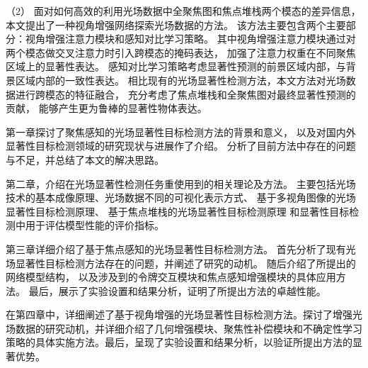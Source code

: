 %
%
（2）
%
%
面对如何高效的利用光场数据中全聚焦图和焦点堆栈两个模态的差异信息，
本文提出了一种视角增强网络探索光场数据的方法。
%
%
该方法主要包含两个主要部分：视角增强注意力模块和感知对比学习策略。
%
%
其中视角增强注意力模块通过对两个模态做交叉注意力时引入跨模态的掩码表达，
加强了注意力权重在不同聚焦区域上的显著性表达。
%
%
感知对比学习策略考虑显著性预测的前景区域内部，与背景区域内部的一致性表达。
%
%
相比现有的光场显著性检测方法，本文方法对光场数据进行跨模态的特征融合，
充分考虑了焦点堆栈和全聚焦图对最终显著性预测的贡献，
能够产生更为鲁棒的显著性物体表达。





第一章探讨了聚焦感知的光场显著性目标检测方法的背景和意义，
以及对国内外显著性目标检测领域的研究现状与进展作了介绍。
分析了目前方法中存在的问题与不足，并总结了本文的解决思路。


第二章，介绍在光场显著性检测任务重使用到的相关理论及方法。
主要包括光场技术的基本成像原理、光场数据不同的可视化表示方式、
基于多视角图像的光场显著性目标检测原理、
基于焦点堆栈的光场显著性目标检测原理
和显著性目标检测中用于评估模型性能的评价指标。


第三章详细介绍了基于焦点感知的光场显著性目标检测方法。
首先分析了现有光场显著性目标检测方法存在的问题，并阐述了研究的动机。
随后介绍了所提出的网络模型结构，
以及涉及到的令牌交互模块和焦点感知增强模块的具体应用方法。
最后，展示了实验设置和结果分析，证明了所提出方法的卓越性能。


在第四章中，详细阐述了基于视角增强的光场显著性目标检测方法。探讨了增强光场数据的研究动机，并详细介绍了几何增强模块、聚焦性补偿模块和不确定性学习策略的具体实施方法。最后，呈现了实验设置和结果分析，以验证所提出方法的显著优势。































